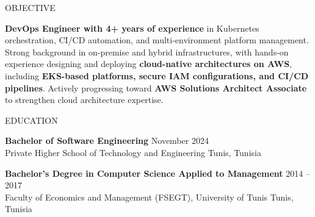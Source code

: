 \documentclass{resume}
\begin{document}
\begin{rSection}{OBJECTIVE}

\textbf{DevOps Engineer with 4+ years of experience} in Kubernetes orchestration, CI/CD automation, and multi-environment platform management. Strong background in on-premise and hybrid infrastructures, with hands-on experience designing and deploying \textbf{cloud-native architectures on AWS}, including \textbf{EKS-based platforms, secure IAM configurations, and CI/CD pipelines}. Actively progressing toward \textbf{AWS Solutions Architect Associate} to strengthen cloud architecture expertise.

\end{rSection}


\begin{rSection}{EDUCATION}

\textbf{Bachelor of Software Engineering} \hfill November 2024 \\
Private Higher School of Technology and Engineering \hfill Tunis, Tunisia \\

\vspace{0.1em}

\textbf{Bachelor's Degree in Computer Science Applied to Management} \hfill 2014 -- 2017 \\
Faculty of Economics and Management (FSEGT), University of Tunis \hfill Tunis, Tunisia \\

\end{rSection}
\end{document}

